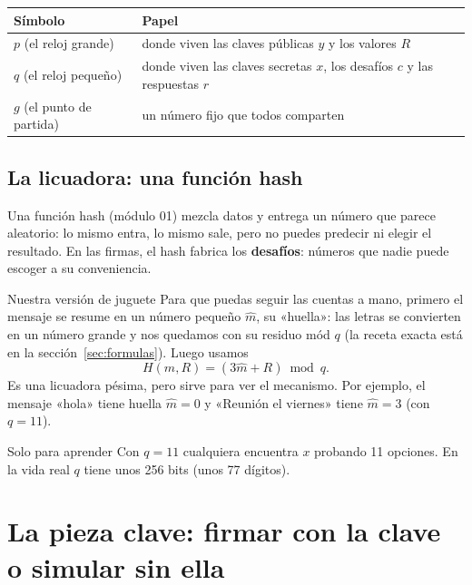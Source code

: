 \documentclass[11pt,a4paper]{article}
\theoremstyle{definition}
\theoremstyle{plain}
\theoremstyle{remark}
\newcommand{\mh}{\hat{m}}
\begin{document}
\begin{center}\small
\captionsetup{type=table}
\caption{Los dos relojes y el punto de partida.}
\label{tab:relojes}
\begin{tabular}{@{}l l@{}}
\toprule
\textbf{Símbolo} & \textbf{Papel} \\
\midrule
$p$ (el reloj grande) & donde viven las claves públicas $y$ y los valores $R$ \\
$q$ (el reloj pequeño) & donde viven las claves secretas $x$, los desafíos $c$ y las respuestas $r$ \\
$g$ (el punto de partida) & un número fijo que todos comparten \\
\bottomrule
\end{tabular}
\end{center}

\subsection{La licuadora: una función hash}

Una función hash (módulo 01) mezcla datos y entrega un número que parece
aleatorio: lo mismo entra, lo mismo sale, pero no puedes predecir ni elegir el
resultado. En las firmas, el hash fabrica los \textbf{desafíos}: números que nadie
puede escoger a su conveniencia.

\begin{caso}{Nuestra versión de juguete}
Para que puedas seguir las cuentas a mano, primero el mensaje se resume en un
número pequeño $\mh$, su «huella»: las letras se convierten en un número grande y
nos quedamos con su residuo mód $q$ (la receta exacta está en la
sección~\ref{sec:formulas}). Luego usamos
\[
  H(m, R) = (3\mh + R) \bmod q .
\]
Es una licuadora pésima, pero sirve para ver el mecanismo. Por ejemplo, el mensaje
«hola» tiene huella $\mh = 0$ y «Reunión el viernes» tiene $\mh = 3$ (con $q = 11$).
\end{caso}

\begin{aviso}{Solo para aprender}
Con $q = 11$ cualquiera encuentra $x$ probando 11 opciones. En la vida real $q$
tiene unos 256 bits (unos 77 dígitos).
\end{aviso}

\section{La pieza clave: firmar con la clave o simular sin ella}\label{sec:simular}
\end{document}
